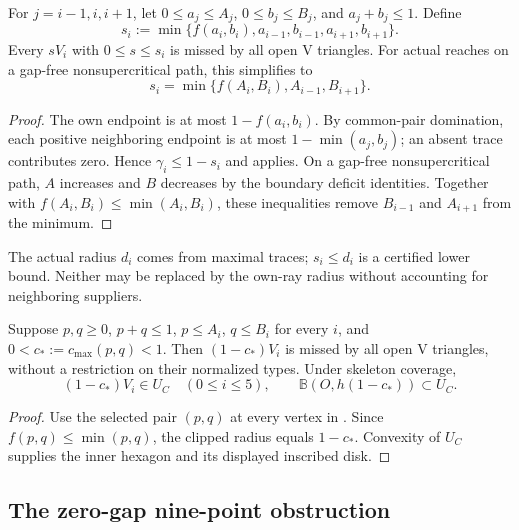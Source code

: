 \begin{corollary}
\label{cor:clipped-radial-forcing}
For $j=i-1,i,i+1$, let $0\le a_j\le A_j$, $0\le b_j\le B_j$, and
$a_j+b_j\le1$. Define
\[
 s_i:=\min\{f(a_i,b_i),a_{i-1},b_{i-1},a_{i+1},b_{i+1}\}.
\]
Every $sV_i$ with $0\le s\le s_i$ is missed by all open V triangles.
For actual reaches on a gap-free nonsupercritical path, this simplifies to
\begin{equation}
 s_i=\min\{f(A_i,B_i),A_{i-1},B_{i+1}\}.
 \label{eq:clipped-path-radius}
\end{equation}
\end{corollary}
\begin{proof}
The own endpoint is at most $1-f(a_i,b_i)$. By common-pair domination,
each positive neighboring endpoint is at most $1-\min(a_j,b_j)$;
an absent trace contributes zero. Hence $\gamma_i\le1-s_i$ and
 applies. On a gap-free
nonsupercritical path, $A$ increases and $B$ decreases by the boundary
deficit identities. Together with $f(A_i,B_i)\le\min(A_i,B_i)$, these
inequalities remove $B_{i-1}$ and $A_{i+1}$ from the minimum.
\end{proof}

The actual radius $d_i$ comes from maximal traces; $s_i\le d_i$ is a
certified lower bound. Neither may be replaced by the own-ray radius
without accounting for neighboring suppliers.

\begin{corollary}
\label{cor:new-uniform-common-pair-forcing}
Suppose $p,q\ge0$, $p+q\le1$, $p\le A_i$, $q\le B_i$ for every $i$,
and $0<c_*:=c_{\max}(p,q)<1$. Then $(1-c_*)V_i$ is missed by all
open V triangles, without a restriction on their normalized types.
Under skeleton coverage,
\[
 (1-c_*)V_i\in U_C\quad(0\le i\le5),
 \qquad \mathbb B(O,h(1-c_*))\subset U_C.
\]
\end{corollary}
\begin{proof}
Use the selected pair $(p,q)$ at every vertex in
. Since $f(p,q)\le\min(p,q)$,
the clipped radius equals $1-c_*$. Convexity of $U_C$ supplies the
inner hexagon and its displayed inscribed disk.
\end{proof}




\subsection{The zero-gap nine-point obstruction}
\label{sec:strategy4-reader}

